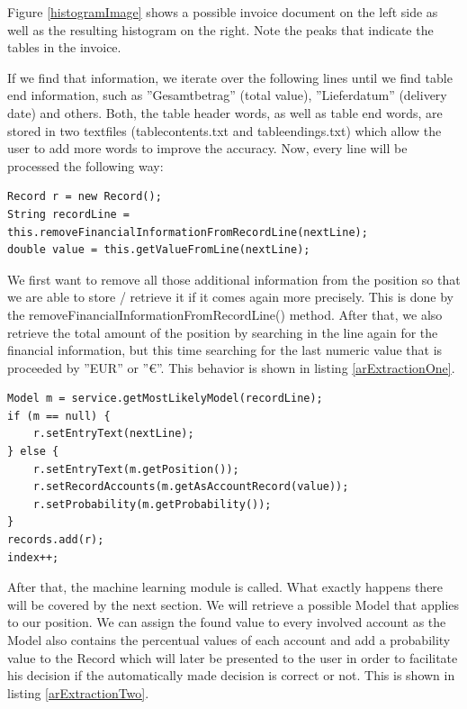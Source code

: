 Figure \ref{histogramImage} shows a possible invoice document on the left side as well as the resulting histogram on the right. Note the peaks that indicate the tables in the invoice.

If we find that information, we iterate over the following lines until we find table end information, such as ''Gesamtbetrag'' (total value), ''Lieferdatum'' (delivery date) and others. Both, the table header words, as well as table end words, are stored in two textfiles (tablecontents.txt and tableendings.txt) which allow the user to add more words to improve the accuracy.
Now, every line will be processed the following way:

\begin{lstlisting}[caption={Manipulating and retrieving information from a position},label={arExtractionOne}]
Record r = new Record();
String recordLine = this.removeFinancialInformationFromRecordLine(nextLine);
double value = this.getValueFromLine(nextLine);
\end{lstlisting}

We first want to remove all those additional information from the position so that we are able to store / retrieve it if it comes again more precisely. This is done by the removeFinancialInformationFromRecordLine() method. After that, we also retrieve the total amount of the position by searching in the line again for the financial information, but this time searching for the last numeric value that is proceeded by ''EUR'' or ''\euro''. This behavior is shown in listing \ref{arExtractionOne}.

\begin{lstlisting}[caption={Finding a model for the position},label={arExtractionTwo}]
Model m = service.getMostLikelyModel(recordLine); 
if (m == null) {
    r.setEntryText(nextLine);
} else {
    r.setEntryText(m.getPosition());
    r.setRecordAccounts(m.getAsAccountRecord(value));
    r.setProbability(m.getProbability());
}
records.add(r);
index++;
\end{lstlisting}

After that, the machine learning module is called. What exactly happens there will be covered by the next section. We will retrieve a possible Model that applies to our position. We can assign the found value to every involved account as the Model also contains the percentual values of each account and add a probability value to the Record which will later be presented to the user in order to facilitate his decision if the automatically made decision is correct or not. This is shown in listing \ref{arExtractionTwo}.


